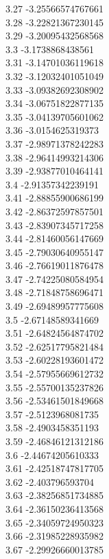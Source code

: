 {3.27	-3.25566574767661\\
3.28	-3.22821367230145\\
3.29	-3.20095432568568\\
3.3	-3.1738868438561\\
3.31	-3.14701036119618\\
3.32	-3.12032401051049\\
3.33	-3.09382692308902\\
3.34	-3.06751822877135\\
3.35	-3.04139705601062\\
3.36	-3.0154625319373\\
3.37	-2.98971378242283\\
3.38	-2.96414993214306\\
3.39	-2.93877010464141\\
3.4	-2.91357342239191\\
3.41	-2.88855900686199\\
3.42	-2.86372597857501\\
3.43	-2.83907345717258\\
3.44	-2.81460056147669\\
3.45	-2.79030640955147\\
3.46	-2.76619011876478\\
3.47	-2.74225080584954\\
3.48	-2.71848758696471\\
3.49	-2.69489957775608\\
3.5	-2.67148589341669\\
3.51	-2.64824564874702\\
3.52	-2.62517795821484\\
3.53	-2.60228193601472\\
3.54	-2.57955669612732\\
3.55	-2.55700135237826\\
3.56	-2.53461501849668\\
3.57	-2.5123968081735\\
3.58	-2.4903458351193\\
3.59	-2.46846121312186\\
3.6	-2.44674205610333\\
3.61	-2.42518747817705\\
3.62	-2.403796593704\\
3.63	-2.38256851734885\\
3.64	-2.36150236413568\\
3.65	-2.34059724950323\\
3.66	-2.31985228935982\\
3.67	-2.29926660013785\\
}
